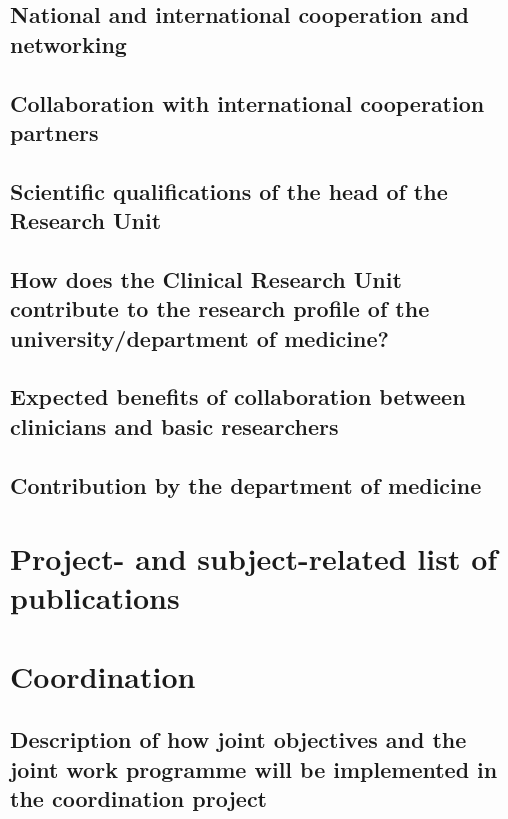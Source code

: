 \documentclass[english, 53.02]{proposal}
\begin{document}
\subsection{National and international cooperation and networking}

\subsection{Collaboration with international cooperation partners}


\subsection{Scientific qualifications of the head of the Research Unit}

\subsection{How does the Clinical Research Unit contribute to the research profile of the university/department of medicine?}

\subsection{Expected benefits of collaboration between clinicians and basic researchers}

\subsection{Contribution by the department of medicine}


\section{Project- and subject-related list of publications}
\printbibliography[heading=none]

\clearpage
\section{Coordination}

\subsection{Description of how joint objectives and the joint work programme will be implemented in the coordination project}
\end{document}
